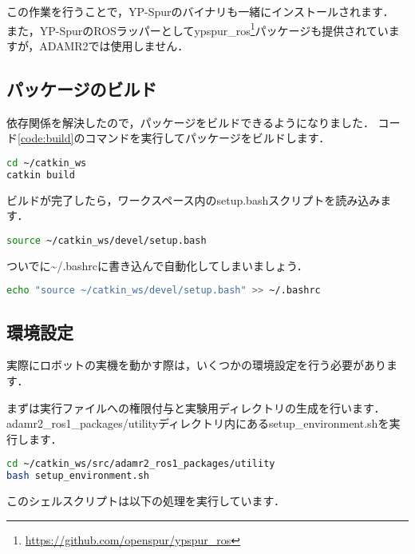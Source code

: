 \documentclass[{../../master}]{subfiles}
\begin{document}
この作業を行うことで，\textsf{YP-Spur}のバイナリも一緒にインストールされます．
また，\textsf{YP-Spur}のROSラッパーとして\textsf{ypspur\_ros}\footnote{\url{https://github.com/openspur/ypspur_ros}}パッケージも提供されていますが，ADAMR2では使用しません．

\subsection{パッケージのビルド}

依存関係を解決したので，パッケージをビルドできるようになりました．
コード\ref{code:build}のコマンドを実行してパッケージをビルドします．

\begin{lstlisting}[language=sh, caption=パッケージのビルド, label=code:build]
cd ~/catkin_ws
catkin build
\end{lstlisting}

ビルドが完了したら，ワークスペース内の\textsf{setup.bash}スクリプトを読み込みます．

\begin{lstlisting}[language=sh, caption=セットアップスクリプトの読み込み]
source ~/catkin_ws/devel/setup.bash
\end{lstlisting}

ついでに\textsf{\~{}/.bashrc}に書き込んで自動化してしまいましょう．

\begin{lstlisting}[language=sh, caption=セットアップスクリプト読み込みの自動化]
echo "source ~/catkin_ws/devel/setup.bash" >> ~/.bashrc
\end{lstlisting}

\subsection{環境設定}

実際にロボットの実機を動かす際は，いくつかの環境設定を行う必要があります．

まずは実行ファイルへの権限付与と実験用ディレクトリの生成を行います．
\textsf{adamr2\_ros1\_packages/utility}ディレクトリ内にある\textsf{setup\_environment.sh}を実行します．

\begin{lstlisting}[language=sh, caption=環境設定スクリプトの実行]
cd ~/catkin_ws/src/adamr2_ros1_packages/utility
bash setup_environment.sh
\end{lstlisting}

このシェルスクリプトは以下の処理を実行しています．
\end{document}
